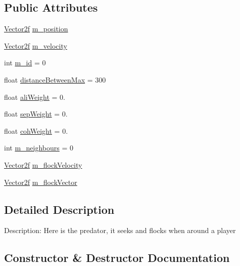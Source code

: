\subsection*{Public Attributes}
\begin{DoxyCompactItemize}
\item 
\mbox{\hyperlink{class_vector2f}{Vector2f}} \mbox{\hyperlink{class_predator_a08fe1220545a64b2c57e7f480a0e572e}{m\+\_\+position}}
\item 
\mbox{\hyperlink{class_vector2f}{Vector2f}} \mbox{\hyperlink{class_predator_a5019723ed9af503dce198a11bb0852f8}{m\+\_\+velocity}}
\item 
int \mbox{\hyperlink{class_predator_a56843e2fa044cd63f18d327f58ee6e50}{m\+\_\+id}} = 0
\item 
float \mbox{\hyperlink{class_predator_abc20de08927cc96a54ff8e79499f27bf}{distance\+Between\+Max}} = 300
\item 
float \mbox{\hyperlink{class_predator_a85ec5ed9b4b40864c759ce7e5e31b468}{ali\+Weight}} = 0.
\item 
float \mbox{\hyperlink{class_predator_a69d8d2679a46ce9d30b49ca9df149c82}{sep\+Weight}} = 0.
\item 
float \mbox{\hyperlink{class_predator_a934675083ce5d755e18102f32361e707}{coh\+Weight}} = 0.
\item 
int \mbox{\hyperlink{class_predator_a64b266324d1d8031e88c436f119346b0}{m\+\_\+neighbours}} = 0
\item 
\mbox{\hyperlink{class_vector2f}{Vector2f}} \mbox{\hyperlink{class_predator_a44e0651b94e62a2ca1b1ea3d69e9f61f}{m\+\_\+flock\+Velocity}}
\item 
\mbox{\hyperlink{class_vector2f}{Vector2f}} \mbox{\hyperlink{class_predator_a414c5d03d3d91d1331ffcdecfa2d97de}{m\+\_\+flock\+Vector}}
\end{DoxyCompactItemize}


\subsection{Detailed Description}
Description\+: Here is the predator, it seeks and flocks when around a player 

\subsection{Constructor \& Destructor Documentation}
\mbox{\label{class_predator_abda10d554bf3bc115474a48c1bfa1dc5}} 
